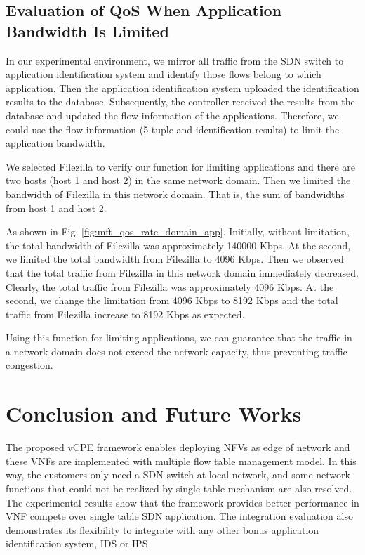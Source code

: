 \documentclass[conference]{IEEEtran}
\begin{document}
\subsection{Evaluation of QoS When Application Bandwidth Is Limited}
In our experimental environment, we mirror all traffic from the SDN switch to application identification system and identify those flows belong to which application.
Then the application identification system uploaded the identification results to the database.
Subsequently, the controller received the results from the database and updated the flow information of the applications.
Therefore, we could use the flow information (5-tuple and identification results) to limit the application bandwidth.

We selected Filezilla to verify our function for limiting applications and there are two hosts (host 1 and host 2) in the same network domain.
Then we limited the bandwidth of Filezilla in this network domain. That is, the sum of bandwidths from host 1 and host 2.

As shown in Fig. \ref{fig:mft_qos_rate_domain_app}.
Initially, without limitation, the total bandwidth of Filezilla was approximately 140000 Kbps.
At the  second, we limited the total bandwidth from Filezilla to 4096 Kbps.
Then we observed that the total traffic from Filezilla in this network domain immediately decreased.
Clearly, the total traffic from Filezilla was approximately 4096 Kbps.
At the  second, we change the limitation from 4096 Kbps to 8192 Kbps and the total traffic from Filezilla increase to 8192 Kbps as expected.

Using this function for limiting applications, we can guarantee that the traffic in a network domain does not exceed the network capacity, thus preventing traffic congestion.




\section{Conclusion and Future Works}
The proposed vCPE framework enables deploying NFVs as edge of network and these VNFs are implemented with multiple flow table management model. In this way, the customers only need a SDN switch at local network, and some network functions that could not be realized by single table mechanism are also resolved. The experimental results show that the framework provides better performance in VNF compete over single table SDN application. The integration evaluation also demonstrates its flexibility to integrate with any other bonus application identification system, IDS or IPS
\end{document}

